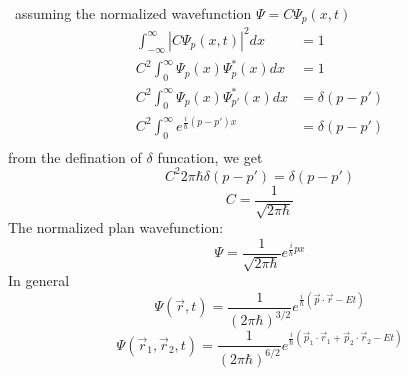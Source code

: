 \begin{frame}[allowframebreaks=]  
    \Solution  ~assuming the normalized wavefunction 
    $\Psi=C\Psi_p (x,t)$
    \begin{equation*}
        \begin{split}
            \int_{-\infty} ^\infty |C\Psi_p (x,t)|^2 dx &=1  \\
            C^2 \int_0 ^\infty \Psi_p (x) \Psi_{p} ^* (x) dx &=1  \\
            C^2 \int_0 ^\infty \Psi_p (x) \Psi_{p'} ^* (x) dx &=\delta (p-p')  \\
            C^2 \int_0 ^\infty e^{\frac{i}{\hbar}(p-p')x} &=\delta (p-p')\\
        \end{split} 
     \end{equation*}
     from the defination of $\delta$ funcation, we get 
     \[C^2 2\pi \hbar \delta (p-p') =\delta(p-p') \]
     \[C= \dfrac{1}{\sqrt{2\pi \hbar}}\]
     The normalized plan wavefunction:
     \begin{equation*}
        \Psi=\frac{1}{\sqrt{2\pi \hbar}} e^{\frac{i}{\hbar}px}
    \end{equation*}  
    In general
    \[ \Psi(\vec r ,t)=\frac{1}{(2\pi \hbar)^{3/2}} e^{\frac{i}{\hbar}(\vec p\cdot \vec r -Et)} \]
    \[ \Psi(\vec r_1 ,\vec r_2, t)=\frac{1}{(2\pi \hbar)^{6/2}} e^{\frac{i}{\hbar}(\vec p_1 \cdot \vec r_1 +\vec p_2 \cdot \vec r_2 -Et)} \]
\end{frame}

